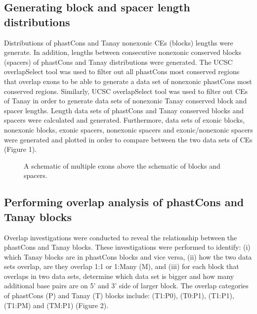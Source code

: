 \documentclass[12pt]{report}
\begin{document}
\subsection{Generating block and spacer length distributions}
Distributions of phastCons and Tanay nonexonic CEs (blocks) lengths were generate. In addition, lengths between consecutive nonexonic conserved blocks (spacers) of phastCons and Tanay distributions were generated. The UCSC overlapSelect tool was used to filter out all phastCons most conserved regions that overlap exons to be able to generate a data set of nonexonic phastCons most conserved regions. Similarly, UCSC overlapSelect tool was used to filter out CEs of Tanay in order to generate data sets of nonexonic Tanay conserved block and spacer lengths. Length data sets of phastCons and Tanay conserved blocks and spacers were calculated and generated. Furthermore, data sets of exonic blocks, nonexonic blocks, exonic spacers, nonexonic spacers and exonic/nonexonic spacers were generated and plotted in order to compare between the two data sets of CEs (Figure 1).\\

\begin{figure}[htbp]
\centering
{}
\caption{A schematic of multiple exons above the schematic of blocks and spacers.}
\label{fig:gene_structure}
\end{figure}

\subsection{Performing overlap analysis of phastCons and Tanay blocks}
Overlap investigations were conducted to reveal the relationship between the phastCons and Tanay blocks. These investigations were performed to identify: (i) which Tanay blocks are in phastCons blocks and vice versa, (ii) how the two data sets overlap, are they overlap 1:1 or 1:Many (M), and (iii) for each block that overlaps in two data sets, determine which data set is bigger and how many additional base pairs are on 5' and 3' side of larger block. The overlap categories of phastCons (P) and Tanay (T) blocks include: (T1:P0), (T0:P1), (T1:P1), (T1:PM) and (TM:P1) (Figure 2).\\
\end{document}
